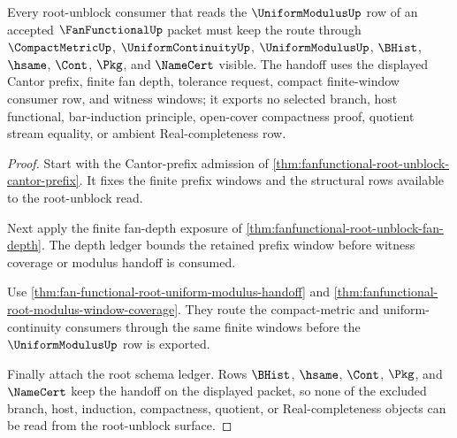 \begin{theorem}
\label{thm:fanfunctional-root-unblock-uniform-modulus}
Every root-unblock consumer that reads the $\UniformModulusUp$ row of an accepted $\FanFunctionalUp$ packet must keep the route through $\CompactMetricUp$, $\UniformContinuityUp$, $\UniformModulusUp$, $\BHist$, $\hsame$, $\Cont$, $\Pkg$, and $\NameCert$ visible. The handoff uses the displayed Cantor prefix, finite fan depth, tolerance request, compact finite-window consumer row, and witness windows; it exports no selected branch, host functional, bar-induction principle, open-cover compactness proof, quotient stream equality, or ambient Real-completeness row.
\end{theorem}
\begin{proof}
Start with the Cantor-prefix admission of \autoref{thm:fanfunctional-root-unblock-cantor-prefix}. It fixes the finite prefix windows and the structural rows available to the root-unblock read.

Next apply the finite fan-depth exposure of \autoref{thm:fanfunctional-root-unblock-fan-depth}. The depth ledger bounds the retained prefix window before witness coverage or modulus handoff is consumed.

Use \autoref{thm:fan-functional-root-uniform-modulus-handoff} and \autoref{thm:fanfunctional-root-modulus-window-coverage}. They route the compact-metric and uniform-continuity consumers through the same finite windows before the $\UniformModulusUp$ row is exported.

Finally attach the root schema ledger. Rows $\BHist$, $\hsame$, $\Cont$, $\Pkg$, and $\NameCert$ keep the handoff on the displayed packet, so none of the excluded branch, host, induction, compactness, quotient, or Real-completeness objects can be read from the root-unblock surface.
\end{proof}

